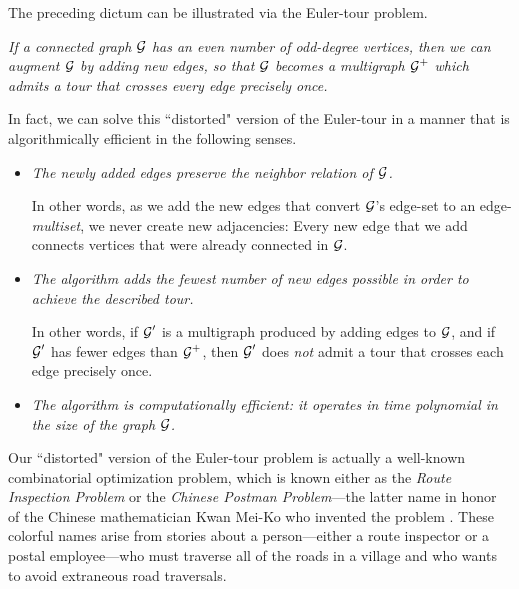 The preceding dictum can be illustrated via the Euler-tour problem.
\begin{description}
\item
{\em If a {\em connected} graph $\mbox{$\cal G$}$ has an {\em even number of odd-degree vertices}, then we can augment $\mbox{$\cal G$}$ by adding new edges, so that $\mbox{$\cal G$}$ becomes a {\em multigraph} $\mbox{$\cal G$}^+$ which admits a tour 
that crosses every edge precisely once.}
\end{description}
In fact, we can solve this ``distorted" version of the Euler-tour in a manner that is algorithmically efficient in the following senses.
\begin{itemize}
\item
{\em The newly added edges preserve the neighbor relation of $\mbox{$\cal G$}$.}

\smallskip

In other words, as we add the new edges that convert $\mbox{$\cal G$}$'s edge-set to an edge-{\em multiset}, we never create new adjacencies: Every new edge that we add connects vertices that were already connected in $\mbox{$\cal G$}$.

\item
{\em The algorithm adds the fewest number of new edges possible in order to achieve the described tour.}

\smallskip

In other words, if $\mbox{$\cal G$}'$ is a multigraph produced by adding edges to $\mbox{$\cal G$}$, and if $\mbox{$\cal G$}'$ has fewer edges than $\mbox{$\cal G$}^+$, then $\mbox{$\cal G$}'$ does {\em not} admit a tour that crosses each edge precisely once.
\item
{\em The algorithm is computationally efficient: it operates in time polynomial in the size of the graph $\mbox{$\cal G$}$.}
\end{itemize}

\medskip

  

Our ``distorted" version of the Euler-tour problem is actually a well-known combinatorial optimization problem, which is known either as the {\it Route Inspection Problem} or the {\it Chinese Postman Problem}---the latter name in honor of the Chinese mathematician Kwan Mei-Ko who invented the problem \cite{Kwan60}.  These colorful names arise from stories about a person---either a route inspector or a postal employee---who must traverse all of the roads in a village and who wants to avoid extraneous road traversals.


